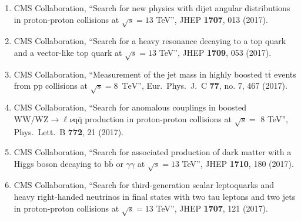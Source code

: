 \begin{enumerate}
\item CMS Collaboration, ``Search for new physics with dijet angular distributions in proton-proton collisions at $ \sqrt{s}=13 $ TeV'', JHEP {\bf 1707}, 013 (2017).

\item CMS Collaboration, ``Search for a heavy resonance decaying to a top quark and a vector-like top quark at $ \sqrt{s}=13 $ TeV'', JHEP {\bf 1709}, 053 (2017).

\item CMS Collaboration, ``Measurement of the jet mass in highly boosted ${\mathrm{t}}\overline{\mathrm{t}}$ events from pp collisions at $\sqrt{s}=8$ $\,\text {TeV}$'', Eur.\ Phys.\ J.\ C {\bf 77}, no. 7, 467 (2017).

\item CMS Collaboration, ``Search for anomalous couplings in boosted $\mathrm{ WW/WZ }\to\ell\nu\mathrm{ q \bar{q} }$ production in proton-proton collisions at $\sqrt{s} =$ 8 TeV'', Phys.\ Lett.\ B {\bf 772}, 21 (2017).

\item CMS Collaboration, ``Search for associated production of dark matter with a Higgs boson decaying to $ \mathrm{b}\overline{\mathrm{b}} $ or $\gamma \gamma$ at $ \sqrt{s}=13$ TeV'', JHEP {\bf 1710}, 180 (2017).

\item CMS Collaboration, ``Search for third-generation scalar leptoquarks and heavy right-handed neutrinos in final states with two tau leptons and two jets in proton-proton collisions at $ \sqrt{s}=13 $ TeV'', JHEP {\bf 1707}, 121 (2017).


\end{enumerate}
